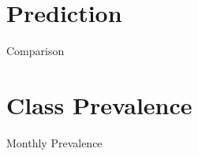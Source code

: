 \documentclass[bigger]{beamer}
\begin{document}
\section{Prediction}
\label{sec:orgaaf77e9}
\begin{frame}[label={sec:org8132d8c}]{Comparison}
\end{frame}
\section{Class Prevalence}
\label{sec:org705e243}
\begin{frame}[label={sec:org88e4a72}]{Monthly Prevalence}
\end{frame}
\end{document}
